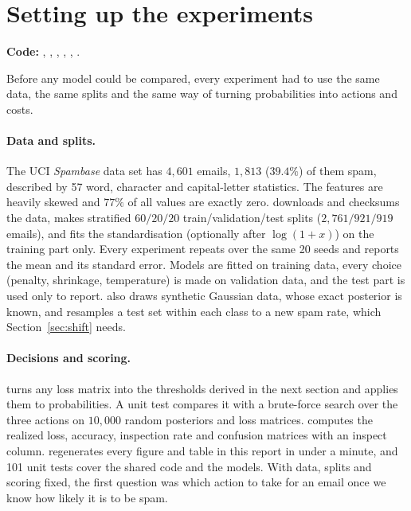 \section{Setting up the experiments}
\label{sec:setup}
\textbf{Code:} , , , ,
, .

Before any model could be compared, every experiment had to use the same data, the same splits and
the same way of turning probabilities into actions and costs.

\paragraph{Data and splits.}
The UCI \emph{Spambase} data set has $4{,}601$ emails, $1{,}813$ ($39.4\%$) of them spam, described by
57 word, character and capital-letter statistics. The features are heavily skewed and $77\%$ of all
values are exactly zero.  downloads and checksums the data, makes stratified
$60/20/20$ train/validation/test splits ($2{,}761/921/919$ emails), and fits the standardisation
(optionally after $\log(1+x)$) on the training part only. Every experiment repeats over the same 20
seeds and reports the mean and its standard error. Models are fitted on training data, every
choice (penalty, shrinkage, temperature) is made on validation data, and the test part is used only
to report.  also draws synthetic Gaussian data, whose exact posterior is known, and
resamples a test set within each class to a new spam rate, which Section~\ref{sec:shift} needs.

\paragraph{Decisions and scoring.}
 turns any loss matrix into the thresholds derived in the next section and applies
them to probabilities. A unit test compares it with a brute-force search over the three actions on
$10{,}000$ random posteriors and loss matrices.  computes the realized loss, accuracy,
inspection rate and confusion matrices with an inspect column.  regenerates every
figure and table in this report in under a minute, and 101 unit tests cover the shared code and the
models. With data, splits and scoring fixed, the first question was which action to take for an
email once we know how likely it is to be spam.
